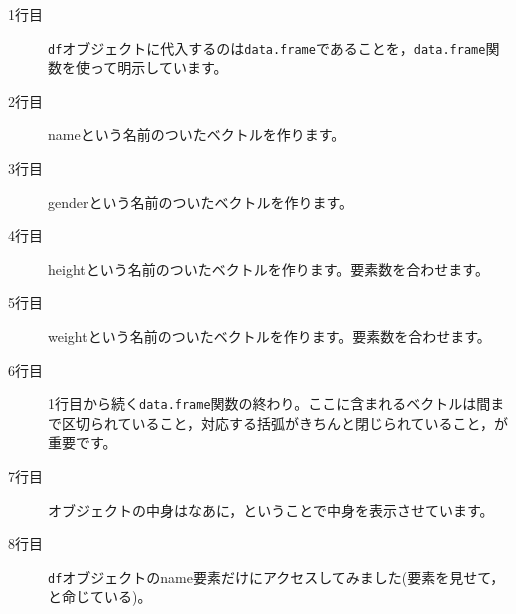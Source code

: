 \begin{description}
	\item[1行目] \texttt{df}オブジェクトに代入するのは\texttt{data.frame}であることを，\texttt{data.frame}関数を使って明示しています。
	\item[2行目] nameという名前のついたベクトルを作ります。
	\item[3行目] genderという名前のついたベクトルを作ります。
	\item[4行目] heightという名前のついたベクトルを作ります。要素数を合わせます。
	\item[5行目] weightという名前のついたベクトルを作ります。要素数を合わせます。
	\item[6行目] 1行目から続く\texttt{data.frame}関数の終わり。ここに含まれるベクトルは間まで区切られていること，対応する括弧がきちんと閉じられていること，が重要です。
	\item[7行目] オブジェクトの中身はなあに，ということで中身を表示させています。
	\item[8行目] \texttt{df}オブジェクトのname要素だけにアクセスしてみました(要素を見せて，と命じている)。
\end{description}
